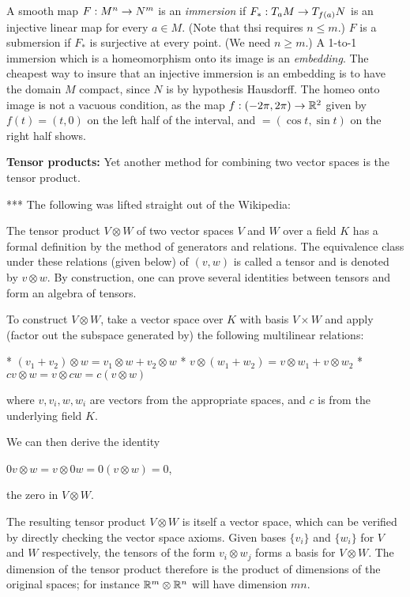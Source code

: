 A smooth map $F:M^n\rightarrow N^m$ is an {\it immersion} if $F_*:T_aM\rightarrow T_{f(a)}N$
is an injective linear map for every $a\in M$. (Note that thsi requires $n\leq m$.)
$F$ is a submersion if $F_*$ is surjective at every point. (We need $n\geq m$.)
A 1-to-1 immersion which is a homeomorphism onto its image is an {\it embedding}.
The cheapest way to insure that an injective immersion is an embedding is to 
have the domain $M$ compact, since $N$ is by hypothesis Hausdorff. The homeo
onto image is not a vacuous condition, as the map $f:(-2\pi,2\pi)\rightarrow {\Bbb R}^2$ given by
$f(t)=(t,0)$ on the left half of the interval, and $=(\cos t,\sin t)$ on the right half shows.

\ssk



\msk

{\bf Tensor products:} Yet another method for combining two vector spaces is the tensor 
product. 

\msk

*** The following was lifted straight out of the Wikipedia: 

\ssk

The tensor product 
$V \otimes W$ of two vector spaces $V$ and $W$ over a field $K$ 
has a formal definition by the method of generators and relations. 
The equivalence class under these relations (given below) of 
$(v,w)$ is called a tensor and is denoted by $v \otimes w$. 
By construction, one can prove several identities between tensors 
and form an algebra of tensors.

To construct $V \otimes W$, take a vector space over $K$ with basis $V \times W$ 
and apply (factor out the subspace generated by) the following multilinear relations:

    * $(v_1+v_2)\otimes w=v_1\otimes w+v_2\otimes w$
    * $v\otimes (w_1+w_2)=v\otimes w_1+v\otimes w_2$
    * $cv\otimes w=v\otimes cw=c(v\otimes w)$

where $v,v_i,w,w_i$ are vectors from the appropriate spaces, 
and $c$ is from the underlying field $K$.

We can then derive the identity

    $0v\otimes w=v\otimes 0w=0(v\otimes w)=0$,

the zero in $V \otimes W$.

The resulting tensor product $V \otimes W$ is itself a vector space, 
which can be verified by directly checking the vector space axioms. 
Given bases $\{v_i\}$ and $\{w_i\}$ for $V$ and $W$ respectively, 
the tensors of the form $v_i \otimes w_j$ forms a basis for $V \otimes W$. 
The dimension of the tensor product therefore is the product of dimensions 
of the original spaces; for instance ${\Bbb R}^m \otimes {\Bbb R}^n$ will have dimension $mn$.


